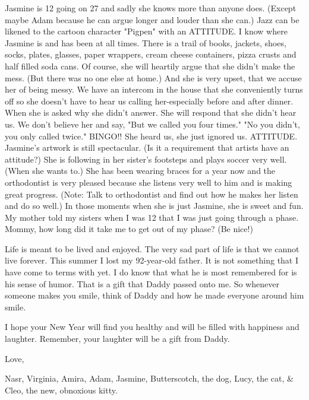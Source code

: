 Jasmine is 12 going on 27 and sadly she knows more than anyone does. (Except maybe Adam because he can argue longer and louder than she can.)
Jazz can be likened to the cartoon character "Pigpen" with an ATTITUDE. I know where Jasmine is and has been at all times. There is a trail of
books, jackets, shoes, socks, plates, glasses, paper wrappers, cream cheese containers, pizza crusts and half filled soda cans. Of course, she
will heartily argue that she didn't make the mess. (But there was no one else at home.) And she is very upset, that we accuse her of being
messy. We have an intercom in the house that she conveniently turns off so she doesn't have to hear us calling her-especially before and after
dinner. When she is asked why she didn't answer. She will respond that she didn't hear us. We don't believe her and say, "But we called you four
times." "No you didn't, you only called twice." BINGO!! She heard us, she just ignored us. ATTITUDE. Jasmine's artwork is still spectacular. (Is
it a requirement that artists have an attitude?) She is following in her sister's footsteps and plays soccer very well. (When she wants to.)
She has been wearing braces for a year now and the orthodontist is very pleased because she listens very well to him and is making great
progress. (Note: Talk to orthodontist and find out how he makes her listen and do so well.) In those moments when she is just Jasmine, she is
sweet and fun. My mother told my sisters when I was 12 that I was just going through a phase. Mommy, how long did it take me to get out of my
phase? (Be nice!)

Life is meant to be lived and enjoyed. The very sad part of life is that we cannot live forever. This summer I lost my 92-year-old father. It is
not something that I have come to terms with yet. I do know that what he is most remembered for is his sense of humor. That is a gift that Daddy
passed onto me. So whenever someone makes you smile, think of Daddy and how he made everyone around him smile.

I hope your New Year will find you healthy and will be filled with happiness and laughter. Remember, your laughter will be a gift from Daddy.

Love,

Nasr, Virginia, Amira, Adam, Jasmine, Butterscotch, the dog, Lucy, the cat, \& Cleo, the new, obnoxious kitty.


%
